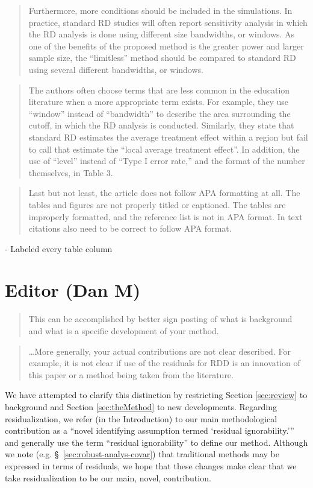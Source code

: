 \documentclass[12pt]{article}
\begin{document}
\begin{quote}
Furthermore, more conditions should be included in the simulations. In
practice, standard RD studies will often report sensitivity analysis
in which the RD analysis is done using different size bandwidths, or
windows. As one of the benefits of the proposed method is the greater
power and larger sample size, the “limitless” method should be
compared to standard RD using several different bandwidths, or
windows.
\end{quote}

\begin{quote}
The authors often choose terms that are less common in the education
literature when a more appropriate term exists. For example, they use
“window” instead of “bandwidth” to describe the area surrounding the
cutoff, in which the RD analysis is conducted. Similarly, they state
that standard RD estimates the average treatment effect within a
region but fail to call that estimate the “local average treatment
effect”. In addition, the use of “level” instead of “Type I error
rate,” and the format of the number themselves, in Table 3.
\end{quote}

\begin{quote}
Last but not least, the article does not follow APA formatting at
all. The tables and figures are not properly titled or captioned. The
tables are improperly formatted, and the reference list is not in APA
format. In text citations also need to be correct to follow APA
format.
\end{quote}
- Labeled every table column

\section{Editor (Dan M)}

\begin{quote}
This can be accomplished by better sign posting of what
is background and what is a specific development of your
method.
\end{quote}
\begin{quote}
\dots More generally, your actual contributions
are not clear described. For example, it is not clear if use of the
residuals for RDD is an innovation of this paper or a method being
taken from the literature.
\end{quote}
We have attempted to clarify this distinction by restricting Section
\ref{sec:review} to background and Section \ref{sec:theMethod} to new
developments. Regarding residualization, we refer (in the
Introduction) to our main
methodological contribution as a ``novel identifying assumption termed
`residual ignorability.''' and generally use the term ``residual
ignorability'' to define our method.
Although we note (e.g. \S~\ref{sec:robust-analys-covar}) that
traditional methods may be expressed in terms of residuals, we hope
that these changes make clear that we take residualization to be our
main, novel, contribution.
\end{document}
